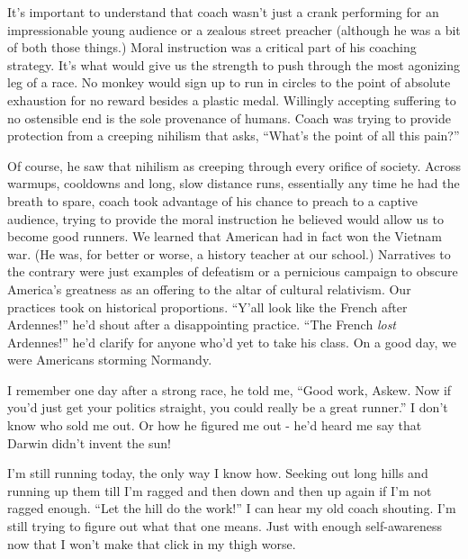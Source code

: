 \documentclass[14pt, oneside]{memoir}
\begin{document}
It's important to understand that coach wasn't just a crank performing
for an impressionable young audience or a zealous street preacher
(although he was a bit of both those things.)
Moral instruction was a critical part of his coaching strategy.
It's what would give us the strength to push through the most
agonizing leg of a race.
No monkey would sign up to run in circles to the point of absolute
exhaustion for no reward besides a plastic medal.
Willingly accepting suffering to no ostensible end is the sole
provenance of humans.
Coach was trying to provide protection from a creeping nihilism that
asks, ``What's the point of all this pain?''

Of course, he saw that nihilism as creeping through every orifice of
society.
Across warmups, cooldowns and long, slow distance runs, essentially
any time he had the breath to spare, coach took advantage of his
chance to preach to a captive audience, trying to provide the moral
instruction he believed would allow us to become good runners.
We learned that American had in fact won the Vietnam war.
(He was, for better or worse, a history teacher at our school.)
Narratives to the contrary were just examples of defeatism or a
pernicious campaign to obscure America's greatness as an offering to
the altar of cultural relativism.
Our practices took on historical proportions.
``Y'all look like the French after Ardennes!'' he'd shout after a
disappointing practice.
``The French \textit{lost} Ardennes!'' he'd clarify for anyone who'd
yet to take his class.
On a good day, we were Americans storming Normandy.

I remember one day after a strong race, he told me, ``Good work,
Askew. Now if you'd just get your politics straight, you could really
be a great runner.''
I don't know who sold me out.
Or how he figured me out - he'd heard me say that Darwin didn't invent
the sun!

I'm still running today, the only way I know how.
Seeking out long hills and running up them till I'm ragged and then
down and then up again if I'm not ragged enough.
``Let the hill do the work!'' I can hear my old coach shouting.
I'm still trying to figure out what that one means.
Just with enough self-awareness now that I won't make that click in my
thigh worse.
\end{document}
